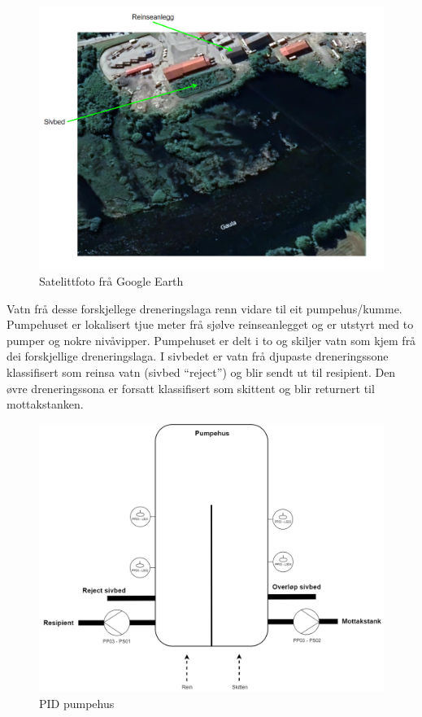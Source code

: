 \begin{figure}[htbp]
    \centering
    \includegraphics[width=1\textwidth]{Bilder/SatelittFoto.png}
    \caption{Satelittfoto frå Google Earth \citep{Google} }\label{fig:Sivbed}
\end{figure}

\newpage

Vatn frå desse forskjellege dreneringslaga renn vidare til eit pumpehus/kumme.
Pumpehuset er lokalisert tjue meter frå sjølve reinseanlegget og er utstyrt med to pumper og nokre nivåvipper.
Pumpehuset er delt i to og skiljer vatn som kjem frå dei forskjellige dreneringslaga.\newline
I sivbedet er vatn frå djupaste dreneringssone klassifisert som reinsa vatn (sivbed ``reject'') og blir sendt ut til resipient.
Den øvre dreneringssona er forsatt klassifisert som skittent og blir returnert til mottakstanken. \newline \newline \newline \newline \newline

\begin{figure}[htbp]
    \centering
    \includegraphics[width=1\textwidth]{Figurar/Pumpehus.drawio.png}
    \caption{\gls{PID} pumpehus}\label{fig:Pumpehus}
\end{figure}

